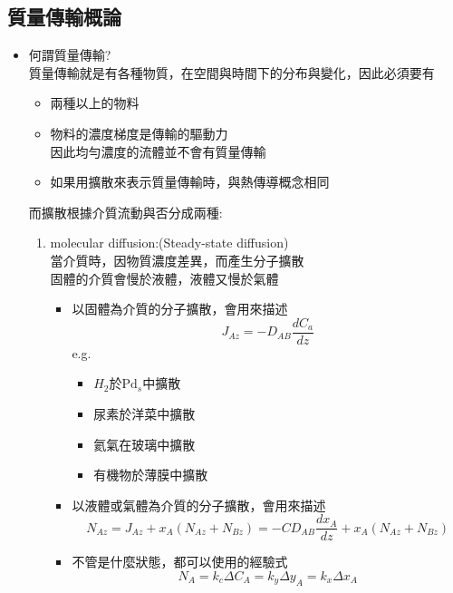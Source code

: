 \documentclass[../main.tex]{subfiles}
\begin{document}
\subsection{質量傳輸概論}
\begin{itemize}
  \item 何謂質量傳輸?\\
  質量傳輸就是有各種物質，在空間與時間下的分布與變化，因此必須要有
  \begin{itemize}
    \item 兩種以上的物料
    \item 物料的濃度梯度是傳輸的驅動力\\
    因此均勻濃度的流體並不會有質量傳輸
    \item 如果用擴散來表示質量傳輸時，與熱傳導概念相同
  \end{itemize}
  而擴散根據介質流動與否分成兩種:
  \begin{enumerate}
    \item molecular diffusion:(Steady-state diffusion)\\
    當介質時，因物質濃度差異，而產生分子擴散\\
    固體的介質會慢於液體，液體又慢於氣體
    \begin{itemize}
      \item 以固體為介質的分子擴散，會用來描述
      \begin{equation}
        \boxed{J_{Az} = -D_{AB}\frac{dC_a}{dz}}
      \end{equation}
      e.g.
      \begin{itemize}
        \item $H_2$於$\text{Pd}_{s}$中擴散
        \item 尿素於洋菜中擴散
        \item 氦氣在玻璃中擴散
        \item 有機物於薄膜中擴散
      \end{itemize}
      \item 以液體或氣體為介質的分子擴散，會用來描述
      \begin{equation}
        \boxed{N_{Az} = J_{Az}+ x_A(N_{Az}+N_{Bz}) = -C D_{AB} \frac{dx_A}{dz} + x_A (N_{Az}+N_{Bz})}
      \end{equation}
      \item 不管是什麼狀態，都可以使用的經驗式
      \begin{equation}
        \boxed{N_A = k_c\Delta C_A = k_y \Delta y_A = k_x \Delta x_A}
      \end{equation}

\end{itemize}
\end{enumerate}
\end{itemize}
\end{document}
